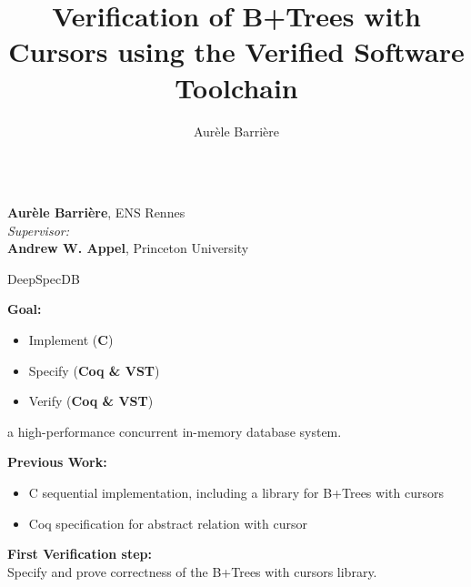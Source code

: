 \documentclass[usenames,dvipsnames]{beamer}
\author[aurele.barriere@ens-rennes.fr]{Aur\`ele Barri\`ere}
\title{Verification of B+Trees with Cursors using the Verified Software Toolchain}
\institute{ENS Rennes - Princeton University}
\def\sublock#1{\textbf{#1:}\\\vspace{0.5cm}}
\def\subsep{\vspace{1cm}}
\begin{document}
\begin{frame}[fragile]
\begin{columns}[T]

\begin{column}{.23\textwidth}

  \textbf{Aurèle Barrière}, ENS Rennes\\
  \textit{Supervisor:}\\ \textbf{Andrew W. Appel}, Princeton University
\begin{block}{DeepSpecDB}
\sublock{Goal}
\begin{itemize}
\item Implement (\textbf{C})
\item Specify (\textbf{Coq \& VST})
\item Verify (\textbf{Coq \& VST})
\end{itemize}
a high-performance {\color{title}concurrent} in-memory database system.
\subsep

\sublock{Previous Work}
\begin{itemize}
\item C sequential implementation, including a library for B+Trees with cursors
\item Coq specification for abstract relation with cursor
\end{itemize}
\subsep

\sublock{First Verification step}
Specify and prove correctness of the B+Trees with cursors library.


\end{block}
\end{column}
\end{columns}
\end{frame}
\end{document}
